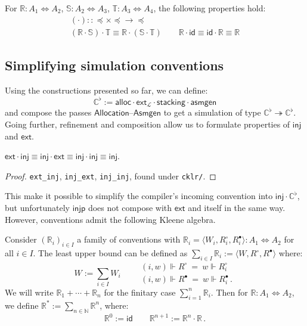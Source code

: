 \documentclass[sigplan,10pt,review,anonymous]{acmart}
\newcommand{\kw}[1]{\ensuremath{ \mathsf{#1} }}
\newcommand{\que}{\circ}
\newcommand{\ans}{\bullet}
\newcommand{\scref}{\preceq}
\begin{document}
\begin{theorem} %
For
$\mathbb{R} : A_1 \Leftrightarrow A_2$,
$\mathbb{S} : A_2 \Leftrightarrow A_3$,
$\mathbb{T} : A_3 \Leftrightarrow A_4$,
the following properties hold:
\begin{gather*}
  ({\cdot}) :: {{\scref} \times {\scref} \rightarrow {\scref}}
  \\
  (\mathbb{R} \cdot \mathbb{S}) \cdot \mathbb{T} \equiv
    \mathbb{R} \cdot (\mathbb{S} \cdot \mathbb{T})
  \qquad
  \mathbb{R} \cdot \kw{id} \equiv
  \kw{id} \cdot \mathbb{R} \equiv
  \mathbb{R}
\end{gather*}
\end{theorem}


\subsection{Simplifying simulation conventions} %

Using the constructions presented so far,
we can define:
\[
    \mathbb{C}^\flat :=
      \kw{alloc} \cdot
      \kw{ext}_\mathcal{L} \cdot
      \kw{stacking} \cdot
      \kw{asmgen}
\]
and compose the passes \kw{Allocation}--\kw{Asmgen}
to get a simulation of type
$\mathbb{C}^\flat \twoheadrightarrow \mathbb{C}^\flat$.
Going further,
refinement and composition allow us to formulate
properties of \kw{inj} and \kw{ext}.

\begin{theorem} \label{thm:extinj}
$
  \kw{ext} \cdot \kw{inj} \equiv
  \kw{inj} \cdot \kw{ext} \equiv
  \kw{inj} \cdot \kw{inj} \equiv
  \kw{inj}
$.
\begin{proof}
\texttt{ext\_inj}, \texttt{inj\_ext}, \texttt{inj\_inj},
found under \texttt{cklr/}.
\end{proof}
\end{theorem}

This make it possible to simplify
the compiler's incoming convention
into $\kw{inj} \cdot \mathbb{C}^\flat$,
but unfortunately \kw{injp}
does not compose with \kw{ext} and itself in the same way.
However, conventions
admit the following Kleene algebra.

\begin{definition} %
Consider $(\mathbb{R}_i)_{i \in I}$
a family of conventions
with
$\mathbb{R}_i = \langle W_i, R_i^\que, R_i^\ans \rangle
  : A_1 \Leftrightarrow A_2$
for all $i \in I$.
The least upper bound
can be defined as
$\sum_{i \in I} \mathbb{R}_i := \langle W, R^\que, R^\ans \rangle$
where:
\[
  W := \sum_{i \in I} W_i  \qquad
  \begin{array}{l}
  (i, w) \Vdash R^\que \: = \: w \Vdash R_i^\que \\[1ex]
  (i, w) \Vdash R^\ans \: = \: w \Vdash R_i^\ans \,.
  \end{array}
\]
We will write $\mathbb{R}_1 + \cdots + \mathbb{R}_n$
for the finitary case $\sum_{i=1}^n \mathbb{R}_i$.
Then for $\mathbb{R} : A_1 \Leftrightarrow A_2$,
we define
$\mathbb{R}^* := \sum_{n \in \mathbb{N}} \mathbb{R}^n$,
where:
\[
  \mathbb{R}^0 := \kw{id} \qquad
  \mathbb{R}^{n+1} := \mathbb{R}^n \cdot \mathbb{R} \,.
\]
\end{definition}
\end{document}
